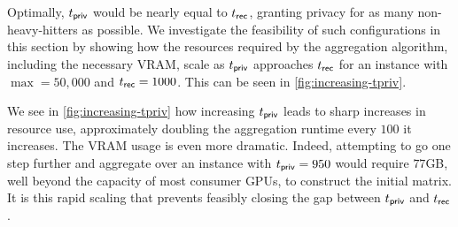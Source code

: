Optimally, $t_{\sf priv}$ would be nearly equal to $t_{\sf rec}$, granting privacy for as many non-heavy-hitters as possible.
We investigate the feasibility of such configurations in this section by showing how the resources required by the aggregation algorithm, including the necessary VRAM, scale as $t_{\sf priv}$ approaches $t_{\sf rec}$ for an instance with $\max = {50},000$ and $t_{\sf rec}=1000$.
This can be seen in \cref{fig:increasing-tpriv}.



We see in \cref{fig:increasing-tpriv} how increasing $t_{\sf priv}$ leads to sharp increases in resource use, approximately doubling the aggregation runtime every $100$ it increases.
The VRAM usage is even more dramatic.
Indeed, attempting to go one step further and aggregate over an instance with $t_{\sf priv} = 950$ would require $77$GB, well beyond the capacity of most consumer GPUs,  to construct the initial matrix.
It is this rapid scaling that prevents feasibly closing the gap between $t_{\sf priv}$ and $t_{\sf rec}$.

